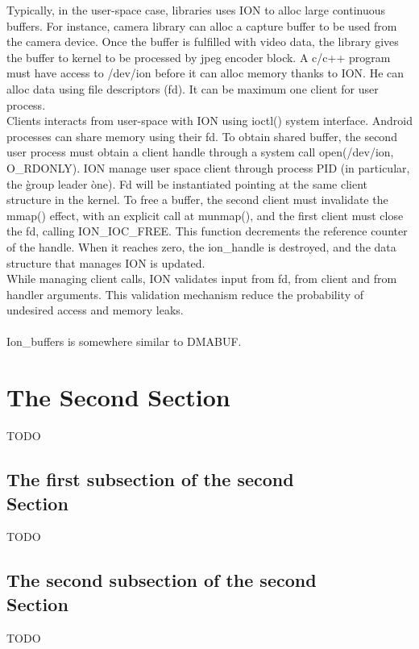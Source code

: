 \documentclass[a4paper,10pt]{article}
\begin{document}
\begin{multicols}{2}
Typically, in the user-space case, libraries uses ION to alloc large continuous buffers. For instance, camera library can alloc
a capture buffer to be used from the camera device. Once the buffer is fulfilled with video data, the library gives the buffer to
kernel to be processed by jpeg encoder block.
A c/c++ program must have access to /dev/ion before it can alloc memory thanks to ION. He can alloc data using file descriptors (fd).
It can be maximum one client for user process.\\
Clients interacts from user-space with ION using ioctl() system interface.
Android processes can share memory using their fd. To obtain shared buffer, the second user process must obtain a client handle
through a system call open(/dev/ion, O\_RDONLY).
ION manage user space client through process PID (in particular, the \`group leader \` one). Fd will be instantiated pointing at
the same client structure in the kernel.
To free a buffer, the second client must invalidate the mmap() effect, with an explicit call at munmap(), and the first client 
must close the fd, calling ION\_IOC\_FREE. This function decrements the reference counter of the handle. When it reaches zero,
the ion\_handle is destroyed, and the data structure that manages ION is updated.
\\
While managing client calls, ION validates input from fd, from client and from handler arguments.
This validation mechanism reduce the probability of undesired access and memory leaks.
\\
\\
Ion\_buffers is somewhere similar to DMABUF.
\section{The Second Section}

TODO
\subsection{The first subsection of the second \\ Section}
TODO
\subsection{The second subsection of the second \\ Section}
TODO




\end{multicols}
\end{document}
